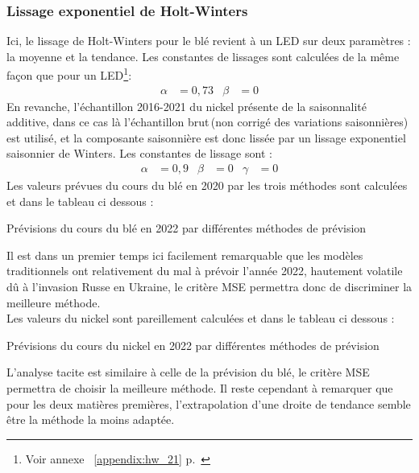 \subsubsection*{Lissage exponentiel de Holt-Winters}
Ici, le lissage de Holt-Winters pour le blé revient à un LED sur deux paramètres : la moyenne et la tendance. Les constantes de lissages sont calculées de la même façon que
pour un LED\footnote{Voir annexe ~\ref{appendix:hw_21} p.~\pageref{appendix:hw_21}}: 
\begin{align*}
    \alpha &= 0,73 & \beta &= 0
\end{align*}
En revanche, l'échantillon 2016-2021 du nickel présente de la saisonnalité additive, dans ce cas là l'échantillon \guillemotleft brut\guillemotright \,(non corrigé des 
variations saisonnières) est utilisé, et la composante saisonnière est donc lissée par un lissage exponentiel saisonnier de Winters. Les constantes de lissage sont :
\begin{align*}
    \alpha &= 0,9 & \beta &= 0 & \gamma &= 0
\end{align*}
Les valeurs prévues du cours du blé en 2020 par les trois méthodes sont calculées et dans le tableau ci dessous :
\begin{table}[H]
    \centering
    \caption{Prévisions du cours du blé en 2022 par différentes méthodes de prévision}
    \sffamily
    
\end{table}
Il est dans un premier temps ici facilement remarquable que les modèles traditionnels ont relativement du mal à prévoir l'année 2022, hautement volatile dû à l'invasion 
Russe en Ukraine, le critère MSE permettra donc de discriminer la meilleure méthode. \\[11pt]
Les valeurs du nickel sont pareillement calculées et dans le tableau ci dessous :
\begin{table}[H]
    \centering
    \caption{Prévisions du cours du nickel en 2022 par différentes méthodes de prévision}
    \sffamily
    
\end{table}
L'analyse tacite est similaire à celle de la prévision du blé, le critère MSE permettra de choisir la meilleure méthode. Il reste cependant à remarquer que pour les deux 
matières premières, l'extrapolation d'une droite de tendance semble être la méthode la moins adaptée.

